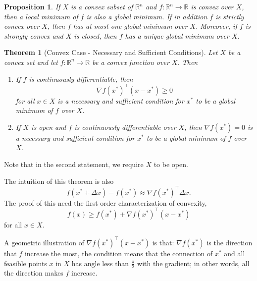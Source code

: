 \documentclass[12pt,a4paper]{article}
\numberwithin{equation}{section}
\theoremstyle{mystyle}
\newtheorem{theorem}[definition]{Theorem}
\newtheorem{proposition}[definition]{Proposition}
\newcommand{\R}{\mathbb{R}}
\newcommand{\grad}{\nabla}
\newcommand{\T}{\top}
\begin{document}
	\begin{proposition}
		If $X$ is a convex subset of $\R^n$ and $f:\R^n \to \R$ is convex over $X$, then a local minimum of $f$ is also a global minimum. If in addition $f$ is strictly convex over $X$, then $f$ has at most one global minimum over $X$. Moreover, if $f$ is strongly convex and $X$ is closed, then $f$ has a unique global minimum over $X$.
	\end{proposition}
	
	\begin{theorem}[Convex Case - Necessary and Sufficient Conditions]
		Let $X$ be a convex set and let $f:\R^n \to \R$ be a convex function over $X$. Then
		\begin{enumerate}
			\item If $f$ is continuously differentiable, then
			$$
			\grad f(x^*)^\T(x-x^*)\geq 0
			$$
			for all $x\in X$ is a necessary and sufficient condition for $x^*$ to be a global minimum of $f$ over $X$.
			\item If $X$ is open and $f$ is continuously differentiable over $X$, then $\grad f(x^*)=0$ is a necessary and sufficient condition for $x^*$ to be a global minimum of $f$ over $X$.
		\end{enumerate}
	\end{theorem}
	Note that in the second statement, we require $X$ to be open.

	The intuition of this theorem is also
	$$
	f(x^*+\Delta x)-f(x^*)\approx \grad f(x^*)^\T \Delta x.
	$$
	The proof of this need the first order characterization of convexity,
	$$
	f(x)\geq f(x^*) +\grad f(x^*)^\T (x-x^*)
	$$
	for all $x\in X$.
	
	A geometric illustration of $\grad f(x^*)^\T(x-x^*)$ is that: $\grad f(x^*)$ is the direction that $f$ increase the most, the condition means that the connection of $x^*$ and all feasible points $x$ in $X$ has angle less than $\frac{\pi}{2}$ with the gradient; in other words, all the direction makes $f$ increase.
	
\end{document}
